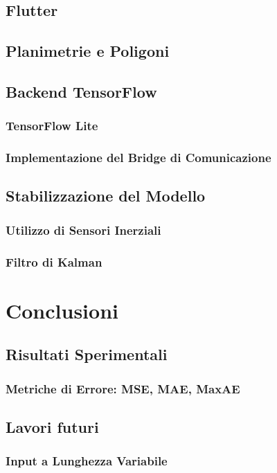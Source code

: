 \documentclass[12pt]{report}
\begin{document}
\section{Flutter}
\section{Planimetrie e Poligoni}
\section{Backend TensorFlow}
\subsection{TensorFlow Lite}
\subsection{Implementazione del Bridge di Comunicazione}
\section{Stabilizzazione del Modello}
\subsection{Utilizzo di Sensori Inerziali}
\subsection{Filtro di Kalman}

\chapter{Conclusioni}
\section{Risultati Sperimentali}
\subsection{Metriche di Errore: MSE, MAE, MaxAE}

\section{Lavori futuri}
\subsection{Input a Lunghezza Variabile}
\end{document}
